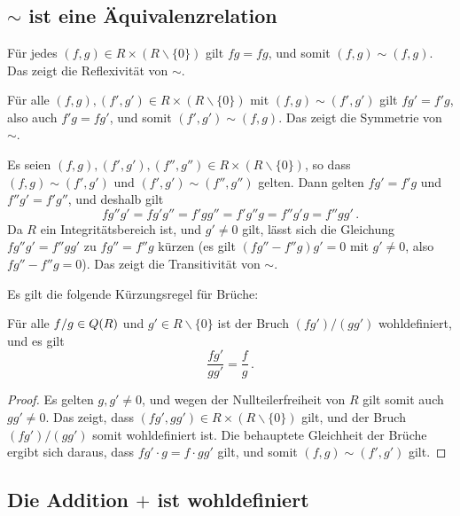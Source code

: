 \section{}





\subsection*{$\sim$ ist eine Äquivalenzrelation}

Für jedes $(f,g) \in R \times (R \smallsetminus\{0\})$ gilt $fg = fg$, und somit $(f,g) \sim (f,g)$.
Das zeigt die Reflexivität von $\sim$.

Für alle $(f,g), (f',g') \in R \times (R \smallsetminus\{0\})$ mit $(f,g) \sim (f',g')$ gilt $fg' = f'g$, also auch $f'g = fg'$, und somit $(f', g') \sim (f,g)$.
Das zeigt die Symmetrie von $\sim$.

Es seien $(f,g), (f', g'), (f'', g'') \in R \times (R \smallsetminus\{0\})$, so dass $(f,g) \sim (f',g')$ und $(f',g') \sim (f'', g'')$ gelten.
Dann gelten $fg' = f'g$ und $f''g' = f'g''$, und deshalb gilt
\[
    fg''g'
  = fg'g''
  = f'gg''
  = f'g''g
  = f''g'g
  = f''gg' \,.
\]
Da $R$ ein Integritätsbereich ist, und $g' \neq 0$ gilt, lässt sich die Gleichung $fg''g' = f''gg'$ zu $fg'' = f''g$ kürzen (es gilt $(fg'' - f''g)g' = 0$ mit $g' \neq 0$, also $fg'' - f''g = 0$).
Das zeigt die Transitivität von $\sim$.

Es gilt die folgende Kürzungsregel für Brüche:

\begin{lemma}
  \label{lemma: cancelling fractions}
  Für alle $f/g \in Q(R)$ und $g' \in R \smallsetminus \{0\}$ ist der Bruch $(fg')/(gg')$ wohldefiniert, und es gilt
  \[
      \frac{fg'}{gg'}
    = \frac{f}{g} \,.
  \]
\end{lemma}

\begin{proof}
  Es gelten $g, g' \neq 0$, und wegen der Nullteilerfreiheit von $R$ gilt somit auch $g g' \neq 0$.
  Das zeigt, dass $(fg', gg') \in R \times (R \smallsetminus \{0\})$ gilt, und der Bruch $(fg')/(gg')$ somit wohldefiniert ist.
  Die behauptete Gleichheit der Brüche ergibt sich daraus, dass $fg' \cdot g = f \cdot g g'$ gilt, und somit $(f,g) \sim (f',g')$ gilt.
\end{proof}





\subsection*{Die Addition $+$ ist wohldefiniert}

